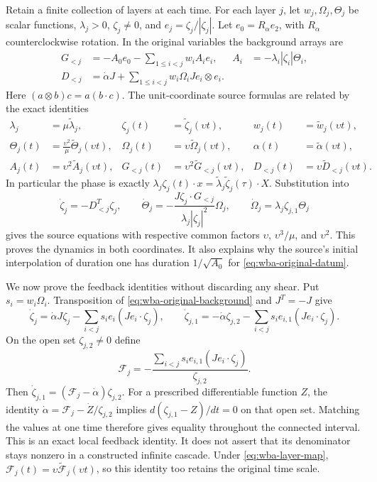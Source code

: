Retain a finite collection of layers at each time. For each layer $j$, let
$w_j,\Omega_j,\Theta_j$ be scalar functions, $\lambda_j>0$,
$\zeta_j\ne0$, and $e_j=\zeta_j/|\zeta_j|$. Let
$e_0=R_\alpha e_2$, with $R_\alpha$ counterclockwise rotation. In the
original variables the background arrays are
\begin{align}\label{eq:wba-original-background}
 G_{<j}&=-A_0e_0-\sum_{1\leq i<j}w_i A_i e_i,
 &A_i&=-\lambda_i|\zeta_i|\Theta_i,\\
 D_{<j}&=\dot\alpha J+
 \sum_{1\leq i<j}w_i\Omega_i Je_i\otimes e_i.
\end{align}
Here $(a\otimes b)c=a(b\cdot c)$. The unit-coordinate source formulas
are related by the exact identities
\begin{align}\label{eq:wba-layer-map}
 \lambda_j&=\mu\widetilde\lambda_j,&
 \zeta_j(t)&=\widetilde\zeta_j(\upsilon t),&
 w_j(t)&=\widetilde w_j(\upsilon t),\\
 \Theta_j(t)&=\frac{\upsilon^2}{\mu}\widetilde\Theta_j(\upsilon t),&
 \Omega_j(t)&=\upsilon\widetilde\Omega_j(\upsilon t),&
 \alpha(t)&=\widetilde\alpha(\upsilon t),\\
 A_j(t)&=\upsilon^2\widetilde A_j(\upsilon t),&
 G_{<j}(t)&=\upsilon^2\widetilde G_{<j}(\upsilon t),&
 D_{<j}(t)&=\upsilon\widetilde D_{<j}(\upsilon t).
\end{align}
In particular the phase is exactly
$\lambda_j\zeta_j(t)\cdot x
=\widetilde\lambda_j\widetilde\zeta_j(\tau)\cdot X$.
Substitution into
\[
 \dot\zeta_j=-D_{<j}^{T}\zeta_j,\qquad
 \dot\Theta_j=-\frac{J\zeta_j\cdot G_{<j}}
 {\lambda_j|\zeta_j|^2}\Omega_j,\qquad
 \dot\Omega_j=\lambda_j\zeta_{j,1}\Theta_j
\]
gives the source equations with respective common factors
$\upsilon$, $\upsilon^3/\mu$, and $\upsilon^2$.
This proves the dynamics in both coordinates. It also explains why the
source's initial interpolation of duration one has duration
$1/\sqrt{A_0}$ for \eqref{eq:wba-original-datum}.

We now prove the feedback identities without discarding any shear. Put
$s_i=w_i\Omega_i$. Transposition of \eqref{eq:wba-original-background}
and $J^T=-J$ give
\begin{equation}\label{eq:wba-covector-components}
 \dot\zeta_j=\dot\alpha J\zeta_j
 -\sum_{i<j}s_i e_i(Je_i\cdot\zeta_j),\qquad
 \dot\zeta_{j,1}=-\dot\alpha\zeta_{j,2}
 -\sum_{i<j}s_i e_{i,1}(Je_i\cdot\zeta_j).
\end{equation}
On the open set $\zeta_{j,2}\ne0$ define
\[
 \mathcal F_j=-\frac{\sum_{i<j}s_i e_{i,1}(Je_i\cdot\zeta_j)}
 {\zeta_{j,2}}.
\]
Then $\dot\zeta_{j,1}=(\mathcal F_j-\dot\alpha)\zeta_{j,2}$.
For a prescribed differentiable function $Z$, the identity
$\dot\alpha=\mathcal F_j-\dot Z/\zeta_{j,2}$ implies
$d(\zeta_{j,1}-Z)/dt=0$ on that open set. Matching the values at one
time therefore gives equality throughout the connected interval.
This is an exact local feedback identity. It does not assert that its
denominator stays nonzero in a constructed infinite cascade.
Under \eqref{eq:wba-layer-map},
$\mathcal F_j(t)=\upsilon\widetilde{\mathcal F}_j(\upsilon t)$,
so this identity too retains the original time scale.

